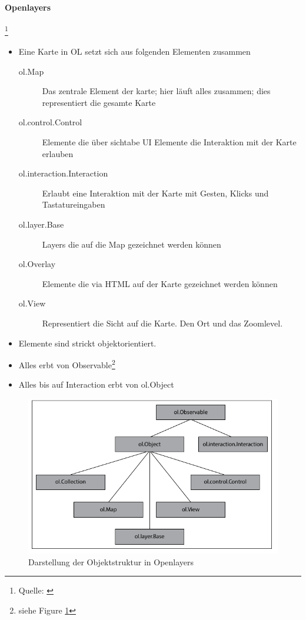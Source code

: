 \documentclass[a4paper,10pt]{article}
\begin{document}
\paragraph{Openlayers} \footnote{Quelle: \cite{ol3begGuide}}

\begin{itemize}
 \item Eine Karte in OL setzt sich aus folgenden Elementen zusammen
 \begin{description}
  \item [ol.Map]   Das zentrale Element der karte; hier läuft alles zusammen; dies representiert die gesamte Karte
  \item [ol.control.Control] Elemente die über sichtabe UI Elemente die Interaktion mit der Karte erlauben
  \item [ol.interaction.Interaction] Erlaubt eine Interaktion mit der Karte mit Gesten, Klicks und Tastatureingaben
  \item [ol.layer.Base]  Layers die auf die Map gezeichnet werden können
  \item [ol.Overlay] Elemente die via \gls{HTML} auf der Karte gezeichnet werden können
  \item [ol.View] Representiert die Sicht auf die Karte. Den Ort und das Zoomlevel.
 \end{description}
\item Elemente sind strickt objektorientiert. 
\item Alles erbt von Observable\footnote{siehe Figure \ref{fig:ol.objektstruktur}}
\item Alles bis auf Interaction erbt von ol.Object
\end{itemize}

\begin{figure}[h!]
 \centering
 \includegraphics[width=\textwidth]{pix/ol_objektstruktur.png}
 \caption{Darstellung der Objektstruktur in Openlayers}
 \label{fig:ol.objektstruktur}
\end{figure}
\end{document}

